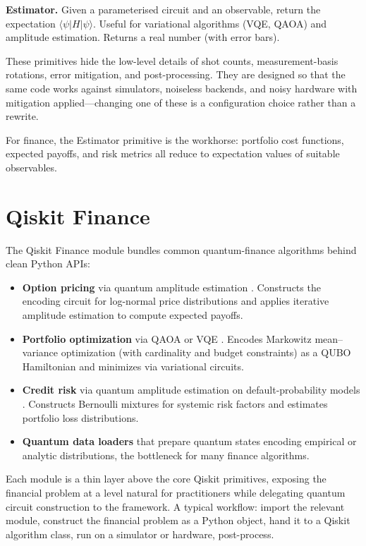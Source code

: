 \textbf{Estimator.} Given a parameterised circuit and an observable, return the expectation $\langle\psi|H|\psi\rangle$. Useful for variational algorithms (VQE, QAOA) and amplitude estimation. Returns a real number (with error bars).

These primitives hide the low-level details of shot counts, measurement-basis rotations, error mitigation, and post-processing. They are designed so that the same code works against simulators, noiseless backends, and noisy hardware with mitigation applied---changing one of these is a configuration choice rather than a rewrite.

For finance, the Estimator primitive is the workhorse: portfolio cost functions, expected payoffs, and risk metrics all reduce to expectation values of suitable observables.

\section{Qiskit Finance}

The Qiskit Finance module \citep{noauthor_quantum_nodate-1} bundles common quantum-finance algorithms behind clean Python APIs:

\begin{itemize}
  \item \textbf{Option pricing} via quantum amplitude estimation \citep{stamatopoulos_option_2020}. Constructs the encoding circuit for log-normal price distributions and applies iterative amplitude estimation to compute expected payoffs.
  \item \textbf{Portfolio optimization} via QAOA or VQE \citep{thomassin_quantum_2025,zaman_po-qa_2024}. Encodes Markowitz mean--variance optimization (with cardinality and budget constraints) as a QUBO Hamiltonian and minimizes via variational circuits.
  \item \textbf{Credit risk} via quantum amplitude estimation on default-probability models \citep{dri_towards_2022}. Constructs Bernoulli mixtures for systemic risk factors and estimates portfolio loss distributions.
  \item \textbf{Quantum data loaders} that prepare quantum states encoding empirical or analytic distributions, the bottleneck for many finance algorithms.
\end{itemize}

Each module is a thin layer above the core Qiskit primitives, exposing the financial problem at a level natural for practitioners while delegating quantum circuit construction to the framework. A typical workflow: import the relevant module, construct the financial problem as a Python object, hand it to a Qiskit algorithm class, run on a simulator or hardware, post-process.

